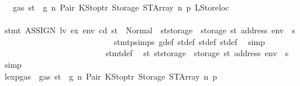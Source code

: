 \begin{isabellebody}
\ {}{\isacharparenleft}{\kern0pt}{}{\isacharparenright}{\kern0pt}\ {\isacharbackquoteopen}{\isasymnot}\ gas\ st\ {\isasymle}\ g{\isacharbackquoteclose}\ n\ Pair\ KStoptr\ Storage\ STArray\ n{}\ p{}\ LStoreloc\isanewline
\ \ \ \ \ \ \ \ \ \ \ \ \ \ \ \ \ \ \ \ \ \ \ \ \isamarkupfalse%
\ {\isachardoublequoteopen}stmt\ {\isacharparenleft}{\kern0pt}ASSIGN\ lv\ ex{\isacharparenright}{\kern0pt}\ env\ cd\ st\ {\isacharequal}{\kern0pt}\ Normal\ {\isacharparenleft}{\kern0pt}{\isacharparenleft}{\kern0pt}{\isacharparenright}{\kern0pt}{\isacharcomma}{\kern0pt}\ st{\isacharprime}{\kern0pt}{\isacharprime}{\kern0pt}{\isacharprime}{\kern0pt}{\isasymlparr}storage\ {\isacharcolon}{\kern0pt}{\isacharequal}{\kern0pt}\ {\isacharparenleft}{\kern0pt}storage\ st{\isacharprime}{\kern0pt}{\isacharprime}{\kern0pt}{\isacharprime}{\kern0pt}{\isacharparenright}{\kern0pt}\ {\isacharparenleft}{\kern0pt}address\ env\ {\isacharcolon}{\kern0pt}{\isacharequal}{\kern0pt}\ s{\isacharparenright}{\kern0pt}{\isasymrparr}{\isacharparenright}{\kern0pt}{\isachardoublequoteclose}\isanewline
\ \ \ \ \ \ \ \ \ \ \ \ \ \ \ \ \ \ \ \ \ \ \ \ \ \ \isamarkupfalse%
\ stmt{\isachardot}{\kern0pt}psimps{\isacharparenleft}{\kern0pt}{}{\isacharparenright}{\kern0pt}\ g{\isacharunderscore}{\kern0pt}def\ st{\isacharprime}{\kern0pt}{\isacharunderscore}{\kern0pt}def\ st{\isacharprime}{\kern0pt}{\isacharprime}{\kern0pt}{\isacharunderscore}{\kern0pt}def\ st{\isacharprime}{\kern0pt}{\isacharprime}{\kern0pt}{\isacharprime}{\kern0pt}{\isacharunderscore}{\kern0pt}def\ \isamarkupfalse%
\ simp\isanewline
\ \ \ \ \ \ \ \ \ \ \ \ \ \ \ \ \ \ \ \ \ \ \ \ \isamarkupfalse%
\ stmt{\isacharunderscore}{\kern0pt}def\ \isamarkupfalse%
\ {\isachardoublequoteopen}st{}{\isacharprime}{\kern0pt}{\isacharequal}{\kern0pt}\ st{\isacharprime}{\kern0pt}{\isacharprime}{\kern0pt}{\isacharprime}{\kern0pt}{\isasymlparr}storage\ {\isacharcolon}{\kern0pt}{\isacharequal}{\kern0pt}\ {\isacharparenleft}{\kern0pt}storage\ st{\isacharprime}{\kern0pt}{\isacharprime}{\kern0pt}{\isacharprime}{\kern0pt}{\isacharparenright}{\kern0pt}\ {\isacharparenleft}{\kern0pt}address\ env\ {\isacharcolon}{\kern0pt}{\isacharequal}{\kern0pt}\ s{\isacharparenright}{\kern0pt}{\isasymrparr}{\isachardoublequoteclose}\ \isamarkupfalse%
\ simp\isanewline
\ \ \ \ \ \ \ \ \ \ \ \ \ \ \ \ \ \ \ \ \ \ \ \ \isamarkupfalse%
\ \isamarkupfalse%
\ lexp{\isacharunderscore}{\kern0pt}gas\ {\isacharbackquoteopen}{\isasymnot}\ gas\ st\ {\isasymle}\ g{\isacharbackquoteclose}\ n\ Pair\ KStoptr\ Storage\ STArray\ n{}\ p{}\ \isamarkupfalse%

\end{isabellebody}
